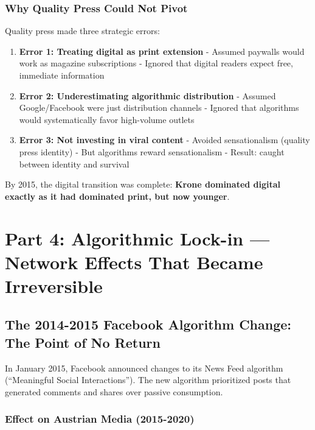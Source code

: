 {\subsubsection*{Why Quality Press Could Not Pivot}

Quality press made three strategic errors:

\begin{enumerate}
\item \textbf{Error 1: Treating digital as print extension}
  - Assumed paywalls would work as magazine subscriptions
  - Ignored that digital readers expect free, immediate information

\item \textbf{Error 2: Underestimating algorithmic distribution}
  - Assumed Google/Facebook were just distribution channels
  - Ignored that algorithms would systematically favor high-volume outlets

\item \textbf{Error 3: Not investing in viral content}
  - Avoided sensationalism (quality press identity)
  - But algorithms reward sensationalism
  - Result: caught between identity and survival
\end{enumerate}

By 2015, the digital transition was complete: \textbf{Krone dominated digital exactly as it had dominated print,
but now younger}.


\section*{Part 4: Algorithmic Lock-in --- Network Effects That Became Irreversible}

\subsection*{The 2014-2015 Facebook Algorithm Change: The Point of No Return}

In January 2015, Facebook announced changes to its News Feed algorithm (``Meaningful Social Interactions'').
The new algorithm prioritized posts that generated comments and shares over passive consumption.

\subsubsection*{Effect on Austrian Media (2015-2020)}

}
